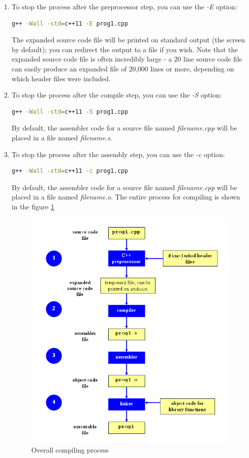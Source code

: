 \documentclass[a4paper]{report}
\begin{document}
\begin{enumerate}
\item
To stop the process after the preprocessor step, you can use the \emph{-E} option:
\begin{lstlisting}[language=bash]
g++ -Wall -std=c++11 -E prog1.cpp
\end{lstlisting}

The expanded source code file will be printed on standard output (the screen by default); you can redirect the output to a file if you wish. Note that the expanded source code file is often incredibly large - a 20 line source code file can easily produce an expanded file of 20,000 lines or more, depending on which header files were included.
\item
To stop the process after the compile step, you can use the \emph{-S} option:

\begin{lstlisting}[language=bash]
g++ -Wall -std=c++11 -S prog1.cpp
\end{lstlisting}

By default, the assembler code for a source file named \emph{filename.cpp} will be placed in a file named \emph{filename.s}.
\item
To stop the process after the assembly step, you can use the \emph{-c} option:
\begin{lstlisting}[language=bash]
g++ -Wall -std=c++11 -c prog1.cpp
\end{lstlisting}

By default, the assembler code for a source file named \emph{filename.cpp} will be placed in a file named \emph{filename.o}.
The entire process for compiling is shown in the figure \ref{1}
\begin{figure}
  \centering
  \includegraphics[width=12cm]{compile.png}
  \caption{Overall compiling process}\label{1}
\end{figure}
\end{enumerate}
\end{document}
